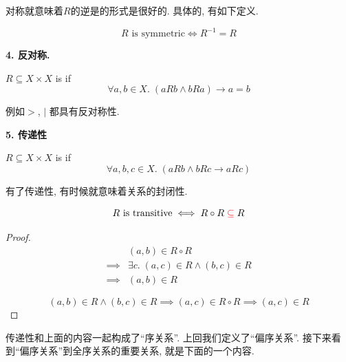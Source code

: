 对称就意味着$R$的逆是的形式是很好的. 具体的, 有如下定义. 
\begin{theorem}
  $$R \text{ is symmetric} \iff R^{-1} = R$$
\end{theorem}

\textbf{4. 反对称. }

\begin{definition}
  $R \subseteq X \times X$ is  if
  \[
    \forall a, b \in X.\; (a R b \land b R a) \to a = b
  \]
\end{definition}

例如$>$, $|$ 都具有反对称性. 

\textbf{5. 传递性}

\begin{definition}
  $R \subseteq X \times X$ is  if
  \[
    \forall a, b, c \in X.\; (a R b \land b R c \to a R c)
  \]

  \begin{center}
\end{center}
\end{definition}

有了传递性, 有时候就意味着关系的封闭性. 
\begin{theorem}
  \[
    R \text{ is transitive} \iff R \circ R \;\textcolor{red}{\subseteq}\; R
  \]
\end{theorem}
\begin{proof}
  \setcounter{equation}{0}
  \begin{align*}
    &(a, b) \in R \circ R \\
    \implies& \exists c.\; (a, c) \in R \land (b, c) \in R \\
    \implies& (a, b) \in R
  \end{align*}

  
    \[
      (a, b) \in R \land (b, c) \in R
      \implies (a, c) \in R \circ R
      \implies (a, c) \in R
    \]
  
\end{proof}

传递性和上面的内容一起构成了``序关系''. 上回我们定义了``偏序关系''. 接下来看到``偏序关系''到全序关系的重要关系, 就是下面的一个内容. 


